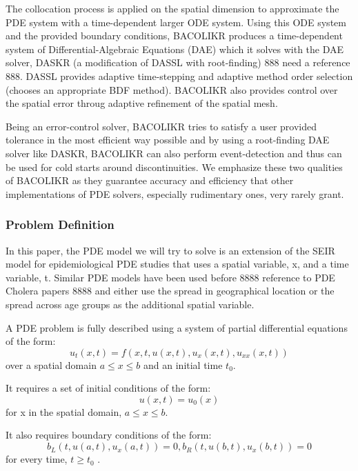 \documentclass{article}
\begin{document}
The collocation process is applied on the spatial dimension to approximate the PDE system with a time-dependent larger ODE system. Using this ODE system and the provided boundary conditions, BACOLIKR produces a time-dependent system of Differential-Algebraic Equations (DAE) which it solves with the DAE solver, DASKR (a modification of DASSL with root-finding) 888 need a reference 888. DASSL provides adaptive time-stepping and adaptive method order selection (chooses an appropriate BDF method). BACOLIKR also provides control over the spatial error throug adaptive refinement of the spatial mesh. 

 
Being an error-control solver, BACOLIKR tries to satisfy a user provided tolerance in the most efficient way possible and by using a root-finding DAE solver like DASKR, BACOLIKR can also perform event-detection and thus can be used for cold starts around discontinuities. We emphasize these two qualities of BACOLIKR as they guarantee accuracy and efficiency that other implementations of PDE solvers, especially rudimentary ones, very rarely grant.

\subsubsection{Problem Definition}
\label{subsection:pde_problem_def}
In this paper, the PDE model we will try to solve is an extension of the SEIR model for epidemiological PDE studies that uses a spatial variable, x, and a time variable, t. Similar PDE models have been used before 8888 reference to PDE Cholera papers 8888 and either use the spread in geographical location or the spread across age groups as the additional spatial variable.

A PDE problem is fully described using a system of partial differential equations of the form:
\begin{equation}
u_t(x, t) = f(x, t, u(x,t), u_x(x,t), u_{xx}(x,t))
\end{equation} 
over a spatial domain ${a \leq x \leq b}$ and an initial time ${t_0}$. 

It requires a set of initial conditions of the form:
\begin{equation}
u(x, t) = u_0(x)
\end{equation}
for x in the spatial domain, ${a \leq x \leq b}$.

It also requires boundary conditions of the form:
\begin{equation}
b_L(t, u(a,t), u_x(a,t)) = 0, b_R(t, u(b,t), u_x(b,t)) = 0 
\end{equation} 
for every time, $t \geq t_0$ .
\end{document}
